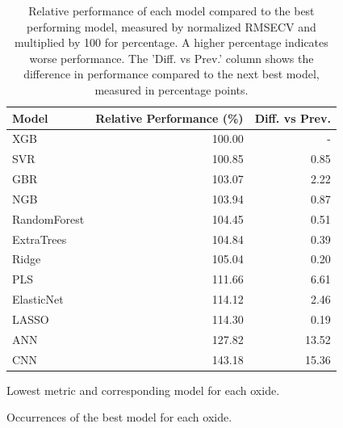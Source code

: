 \begin{table}[ht]
\begin{tabular}{lrr}
\toprule
Model & Relative Performance (\%) & Diff. vs Prev. \\
\midrule
XGB & 100.00 & - \\
SVR & 100.85 & 0.85 \\
GBR & 103.07 & 2.22 \\
NGB & 103.94 & 0.87 \\
RandomForest & 104.45 & 0.51 \\
ExtraTrees & 104.84 & 0.39 \\
Ridge & 105.04 & 0.20 \\
PLS & 111.66 & 6.61 \\
ElasticNet & 114.12 & 2.46 \\
LASSO & 114.30 & 0.19 \\
ANN & 127.82 & 13.52 \\
CNN & 143.18 & 15.36 \\
\bottomrule
\end{tabular}
\caption{Relative performance of each model compared to the best performing model, measured by normalized RMSECV and multiplied by 100 for percentage. A higher percentage indicates worse performance. The 'Diff. vs Prev.' column shows the difference in performance compared to the next best model, measured in percentage points.}
\label{tab:relative_performance}
\end{table}



\begin{table}[h]
\centering
\begin{minipage}{.7\textwidth}
  \centering
  
  \caption{Lowest metric and corresponding model for each oxide.}
  \label{tab:best_results}
\end{minipage}%
\hspace{0.03\textwidth}
\begin{minipage}{.25\textwidth}
  \centering
  
  \caption{Occurrences of the best model for each oxide.}
  \label{tab:best_model_occurrences}
\end{minipage}
\end{table}
